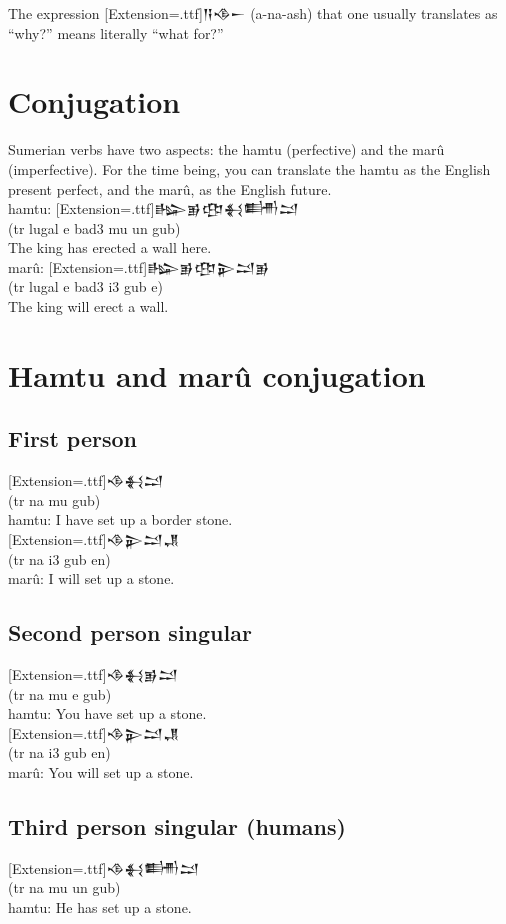 \documentclass[a4paper,12pt]{book}
\newcommand{\fcn}{\setmainfont{Akkadian}[Extension=.ttf]}
\newcommand{\fsm}{\Large\setmainfont{Akkadian}[Extension=.ttf]}
\begin{document}
The expression {\fcn 𒀀𒈾𒀸} (a-na-ash)
that one usually translates as ``why?''
means literally ``what for?''

\newpage
\section*{Conjugation}
Sumerian verbs have two aspects: the hamtu (perfective)
and the marû (imperfective). For the time being,
you can translate the hamtu as the English present
perfect, and the marû, as the English future.\\

\noindent
hamtu: {\fsm 𒈗𒂊𒂦𒈬𒌦𒁺}\\
(tr lugal e bad3 mu un gub)\\
The king has erected a wall here.\\

\noindent
marû: {\fsm 𒈗𒂊𒂦𒉌𒁺𒂊}\\
(tr lugal e bad3 i3 gub e)\\
The king will erect a wall.

\section*{Hamtu and marû conjugation}

\subsection*{First person}
{\fsm 𒈾𒈬𒁺}\\
(tr na mu gub)\\
hamtu: I have set up a border stone.\\

\noindent
{\fsm 𒈾𒉌𒁺𒂗}\\
(tr na i3 gub en)\\
marû: I will set up a stone.

\subsection*{Second person singular}
{\fsm 𒈾𒈬𒂊𒁺}\\
(tr na mu e gub)\\
hamtu: You have set up a stone.\\

\noindent
{\fsm 𒈾𒉌𒁺𒂗}\\
(tr na i3 gub en)\\
marû: You will set up a stone.

\newpage
\subsection*{Third person singular (humans)}
{\fsm 𒈾𒈬𒌦𒁺}\\
(tr na mu un gub)\\
hamtu: He has set up a stone.\\
\end{document}
